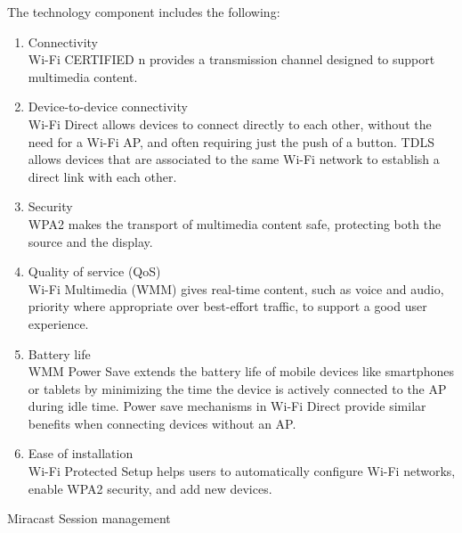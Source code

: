 The technology component includes the following:
\begin{enumerate}
\item Connectivity\\
Wi-Fi CERTIFIED n provides a transmission channel designed to support
multimedia content.
\item Device-to-device connectivity\\
Wi-Fi Direct allows devices to connect directly to each other, without the
need for a Wi-Fi AP, and often requiring just the push of a button. TDLS allows
devices that are associated to the same Wi-Fi network to establish a direct
link with each other.
\item Security\\ 
WPA2 makes the transport of multimedia content safe,
protecting both the source and the display.
\item Quality of service (QoS)\\
Wi-Fi Multimedia (WMM) gives real-time content, such as voice and audio,
priority where appropriate over best-effort traffic, to support a good user
experience.
\item Battery life \\
WMM Power Save extends the battery life of mobile devices
like smartphones or tablets by minimizing the time the device is actively
connected to the AP during idle time. Power save mechanisms in Wi-Fi Direct
provide similar benefits when connecting devices without an AP.
\item Ease of installation\\
Wi-Fi Protected Setup helps users to automatically configure Wi-Fi networks,
enable WPA2 security, and add new devices.
\end{enumerate}

Miracast Session management

